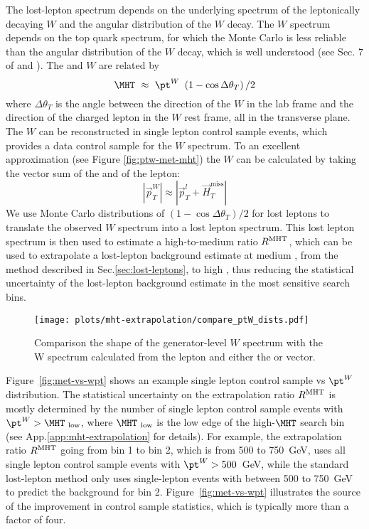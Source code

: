 The lost-lepton \MHT spectrum depends on the underlying \pt spectrum of the leptonically decaying $W$
and the angular distribution of the $W$ decay.
The $W$ \pt spectrum depends on the top quark \pt spectrum, for which the Monte Carlo is less reliable
than the angular distribution of the $W$ decay, which is well understood (see Sec. 7 of \cite{RA2bSummer2011}
and \cite{w-helicity-fractions-theory}).
The \MHT and $W$ \pt are related by
% 
\begin{equation}
  \label{eq:mht-wpt}
  \MHT \ \approx \ \pt^W \ \left( 1 - \cos \Delta \theta_T \right) / 2
\end{equation}
% 
where $\Delta \theta_T$ is the angle between the direction of the $W$ in the lab frame and the direction
of the charged lepton in the $W$ rest frame, all in the transverse plane.
The $W$ \pt can be reconstructed in single lepton control sample events, which provides a data control
sample for the $W$ \pt spectrum.  To an excellent approximation (see Figure \ref{fig:ptw-met-mht}) the $W$ \pt can be calculated by taking the vector sum of the \MHT and \pt of the lepton:
\begin{equation}
  \label{eq:wpt-reco}
  |\vec{p}_T^W| \approx |\vec{p}_T^l+\vec{H}_{T}^{\mathrm{miss}}|
\end{equation}
We use Monte Carlo distributions of $\left( 1 - \cos \Delta \theta_T \right) / 2$
for lost leptons to translate the observed $W$ \pt spectrum into a lost lepton \MHT spectrum.
This lost lepton \MHT spectrum is then used to estimate a high-to-medium \MHT ratio $R^{\rm MHT}$, which can be used
to extrapolate a lost-lepton background estimate at medium \MHT, from the method described in Sec.\ref{sec:lost-leptons},
to high \MHT, thus reducing the statistical uncertainty of the lost-lepton background estimate in the
most sensitive search bins.

\begin{figure}[!h]
  \centering
  \texttt{[image: plots/mht-extrapolation/compare\_ptW\_dists.pdf]}
  \caption{ Comparison the shape of the generator-level $W$ \pt spectrum with the W \pt spectrum calculated from the lepton \pt and either the \MET or \MHT vector.
  }
  \label{fig:ptW-met-mht}
\end{figure}

Figure~\ref{fig:met-vs-wpt} shows an example single lepton control sample \MHT vs $\pt^W$ distribution.
The statistical uncertainty on the \MHT extrapolation ratio $R^{\rm MHT}$ is mostly determined by
the number of single lepton control sample events with $\pt^W > \MHT_{\rm\ low}$, where $\MHT_{\rm\ low}$
is the low edge of the high-$\MHT$ search bin (see App.\ref{app:mht-extrapolation} for details).
For example, the extrapolation ratio $R^{\rm MHT}$ going from \MHT bin 1 to \MHT bin 2, which is from
500 to 750~GeV, uses all single lepton control sample events with $\pt^W>500$~GeV, while the
standard lost-lepton method only uses single-lepton events with \MHT between 500 to 750~GeV
to predict the background for \MHT bin 2.
Figure~\ref{fig:met-vs-wpt} illustrates the source of the improvement in control sample statistics,
which is typically more than a factor of four.


